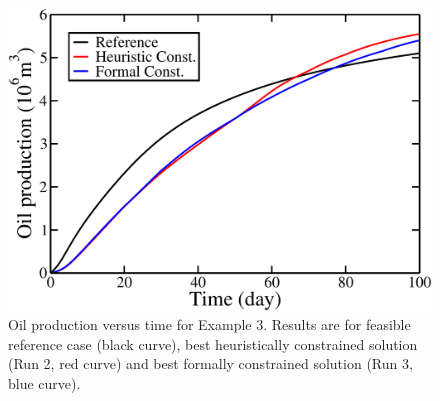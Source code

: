 

\begin{figure} [ht]
\begin{center}
\includegraphics[totalheight=2.2in,angle=0]{figures/vanEssenRevenue.pdf}
\end{center}
\caption{Oil production versus time for Example 3. Results are for
  feasible reference case (black curve), best heuristically constrained solution (Run 2, red curve)
  and best formally constrained solution (Run 3, blue curve).}
\label{fig:VanEssenRevenue}
\end{figure}



